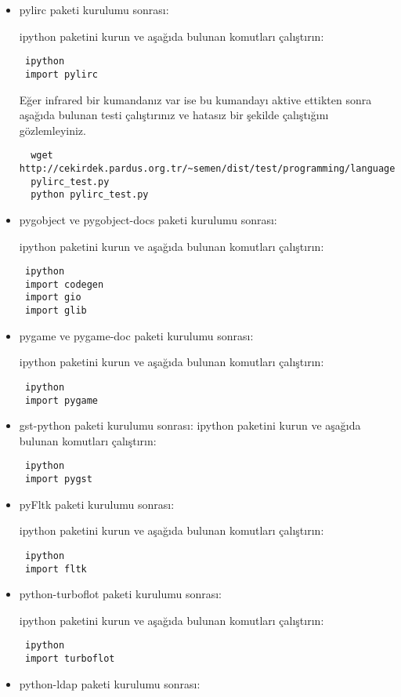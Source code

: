 \documentclass[a4paper,10pt]{article}
\begin{document}
\begin{itemize}
\item pylirc paketi kurulumu sonrası:

ipython paketini kurun ve aşağıda bulunan komutları çalıştırın:
\begin{verbatim}
 ipython
 import pylirc
\end{verbatim}

Eğer infrared bir kumandanız var ise bu kumandayı aktive ettikten sonra aşağıda bulunan testi çalıştırınız ve hatasız bir şekilde çalıştığını gözlemleyiniz.
\begin{verbatim}
  wget http://cekirdek.pardus.org.tr/~semen/dist/test/programming/language/python/
  pylirc_test.py
  python pylirc_test.py
\end{verbatim}


\item pygobject ve pygobject-docs paketi kurulumu sonrası:

ipython paketini kurun ve aşağıda bulunan komutları çalıştırın:
\begin{verbatim}
 ipython
 import codegen
 import gio
 import glib
\end{verbatim}
\item pygame ve pygame-doc paketi kurulumu sonrası:

ipython paketini kurun ve aşağıda bulunan komutları çalıştırın:
\begin{verbatim}
 ipython
 import pygame
\end{verbatim}

\item gst-python paketi kurulumu sonrası:
ipython paketini kurun ve aşağıda bulunan komutları çalıştırın:
\begin{verbatim}
 ipython
 import pygst
\end{verbatim}

\item pyFltk paketi kurulumu sonrası:

ipython paketini kurun ve aşağıda bulunan komutları çalıştırın:
\begin{verbatim}
 ipython
 import fltk
\end{verbatim}

\item python-turboflot paketi kurulumu sonrası:

ipython paketini kurun ve aşağıda bulunan komutları çalıştırın:
\begin{verbatim}
 ipython
 import turboflot
\end{verbatim}

\item python-ldap paketi kurulumu sonrası:


\end{itemize}
\end{document}

